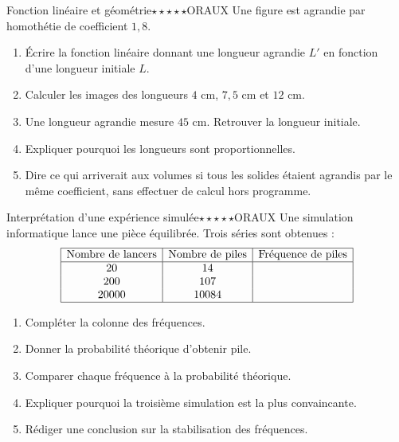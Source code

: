 \documentclass[11pt,a4paper]{article}
\newcounter{exo}
\begin{document}
\begin{exobox}{Fonction linéaire et géométrie}{$\star\star\star\star\star$}{ORAUX}
Une figure est agrandie par homothétie de coefficient $1{,}8$.
\begin{enumerate}
\item Écrire la fonction linéaire donnant une longueur agrandie $L'$ en fonction d'une longueur initiale $L$.
\item Calculer les images des longueurs $4$ cm, $7{,}5$ cm et $12$ cm.
\item Une longueur agrandie mesure $45$ cm. Retrouver la longueur initiale.
\item Expliquer pourquoi les longueurs sont proportionnelles.
\item Dire ce qui arriverait aux volumes si tous les solides étaient agrandis par le même coefficient, sans effectuer de calcul hors programme.
\end{enumerate}
\end{exobox}

\begin{exobox}{Interprétation d'une expérience simulée}{$\star\star\star\star\star$}{ORAUX}
Une simulation informatique lance une pièce équilibrée. Trois séries sont obtenues :
\[
\begin{array}{|c|c|c|}
\hline
\text{Nombre de lancers} & \text{Nombre de piles} & \text{Fréquence de piles} \\
\hline
20 & 14 &  \\
200 & 107 &  \\
20000 & 10084 &  \\
\hline
\end{array}
\]
\begin{enumerate}
\item Compléter la colonne des fréquences.
\item Donner la probabilité théorique d'obtenir pile.
\item Comparer chaque fréquence à la probabilité théorique.
\item Expliquer pourquoi la troisième simulation est la plus convaincante.
\item Rédiger une conclusion sur la stabilisation des fréquences.
\end{enumerate}
\end{exobox}
\end{document}
